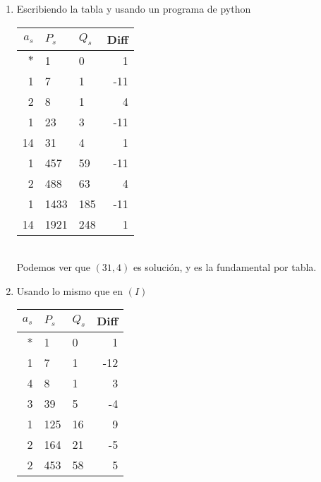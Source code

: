 \begin{sol}
	\begin{enumerate}[label = (\roman*)]
		\item Escribiendo la tabla y usando un programa de python\cite{prog}\\
		      \begin{tabular}{| r | l | l | r |}
			      \hline
			      $a_s$ & $P_s$ & $Q_s$ & Diff \\
			      \hline\hline
			      $*$   & 1     & 0     & 1    \\
			      \hline
			      1     & 7     & 1     & -11  \\
			      \hline
			      2     & 8     & 1     & 4    \\
			      \hline
			      1     & 23    & 3     & -11  \\
			      \hline
			      14    & 31    & 4     & 1    \\
			      \hline
			      1     & 457   & 59    & -11  \\
			      \hline
			      2     & 488   & 63    & 4    \\
			      \hline
			      1     & 1433  & 185   & -11  \\
			      \hline
			      14    & 1921  & 248   & 1    \\
			      \hline
		      \end{tabular}\\
		      Podemos ver que $(31,4)$ es solución, y es la fundamental por tabla.
		\item Usando lo mismo que en $(I)$\\
		      \begin{tabular}{| r | l | l | r |}
			      \hline
			      $a_s$ & $P_s$      & $Q_s$     & Diff \\
			      \hline\hline
			      $*$   & 1          & 0         & 1    \\
			      \hline
			      1     & 7          & 1         & -12  \\
			      \hline
			      4     & 8          & 1         & 3    \\
			      \hline
			      3     & 39         & 5         & -4   \\
			      \hline
			      1     & 125        & 16        & 9    \\
			      \hline
			      2     & 164        & 21        & -5   \\
			      \hline
			      2     & 453        & 58        & 5    \\
			      \hline

\end{tabular}
\end{enumerate}
\end{sol}

